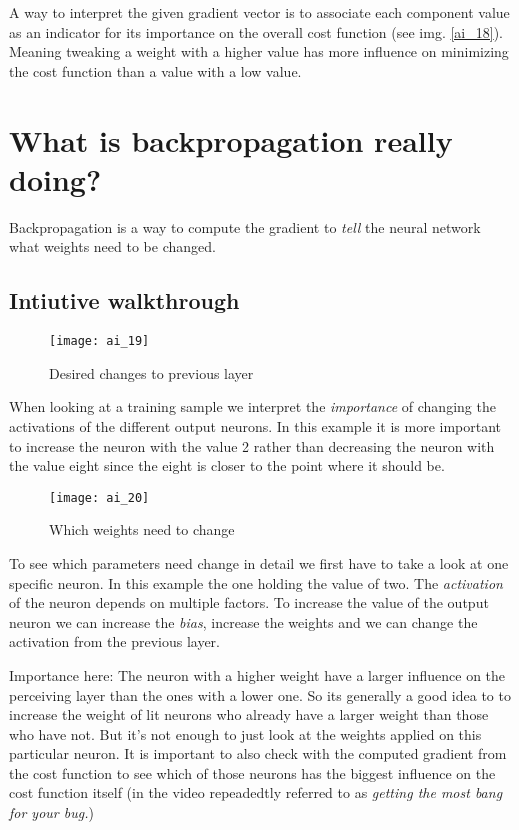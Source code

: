 \documentclass{article}
\begin{document}
A way to interpret the given gradient vector is to associate each component value as an indicator for its importance on the overall cost function (see img. \ref{ai_18}). Meaning tweaking a weight with a higher value has more influence on minimizing the cost function than a value with a low value.




\section{What is backpropagation really doing?}

Backpropagation is a way to compute the gradient to \textit{tell} the neural network what weights need to be changed. 

\subsection{Intiutive walkthrough}

\begin{figure}[!htbp]
	\centering
	\texttt{[image: ai\_19]}
	\caption{Desired changes to previous layer}
	\label{ai_19}
\end{figure}

When looking at a training sample we interpret the \textit{importance} of changing the activations of the different output neurons. In this example it is more important to increase the neuron with the value 2 rather than decreasing the neuron with the value eight since the eight is closer to the point where it should be. 


\begin{figure}[!htbp]
	\centering
	\texttt{[image: ai\_20]}
	\caption{Which weights need to change}
	\label{ai_20}
\end{figure}

To see which parameters need change in detail we first have to take a look at one specific neuron. In this example the one holding the value of two. The \textit{activation} of the neuron depends on multiple factors. To increase the value of the output neuron we can increase the \textit{bias}, increase the weights and we can change the activation from the previous layer.

Importance here: The neuron with a higher weight have a larger influence on the perceiving layer than the ones with a lower one. So its generally a good idea to to increase the weight of lit neurons who already have a larger weight than those who have not. But it's not enough to just look at the weights applied on this particular neuron. It is important to also check with the computed gradient from the cost function to see which of those neurons has the biggest influence on the cost function itself (in the video repeadedtly referred to as \textit{getting the most bang for your bug.}) 
\end{document}
